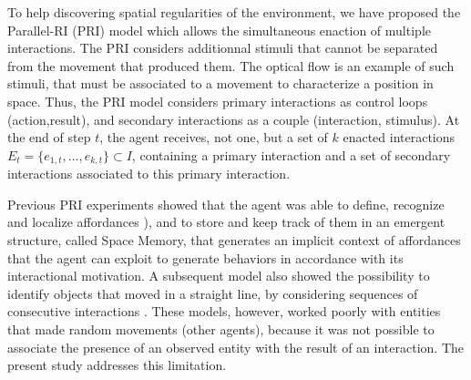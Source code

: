 \documentclass[conference]{IEEEtran}
\begin{document}
To help discovering spatial regularities of the environment, we have proposed the Parallel-RI (PRI) model \cite{gay:space} which allows the simultaneous enaction of multiple interactions.
The PRI considers additionnal stimuli that cannot be separated from the movement that produced them. The optical flow is an example of such stimuli, that must be associated to a movement to characterize a position in space. Thus, the PRI model considers primary interactions as control loops (action,result), and secondary interactions as a couple (interaction, stimulus).
At the end of step $t$, %
the agent receives, not one, but a set of $k$ enacted interactions $E_t=\{e_{1,t},..., e_{k,t}\} \subset I$, containing a primary interaction and a set of secondary interactions associated to this primary interaction. %

Previous PRI experiments showed that the agent was able to define, recognize and localize affordances \cite{gibson:affordances}), %
and to store and keep track of them in an emergent structure, called Space Memory, that generates an implicit context of affordances that the agent can exploit to generate behaviors in accordance with its interactional motivation.
A subsequent model also showed the possibility to identify objects that moved in a straight line, by considering sequences of consecutive interactions \cite{gay:dynamic}. 
These models, however, worked poorly with entities that made random movements (other agents), because it was not possible to associate the presence of an observed entity with the result of an interaction. The present study addresses this limitation.

\end{document}
